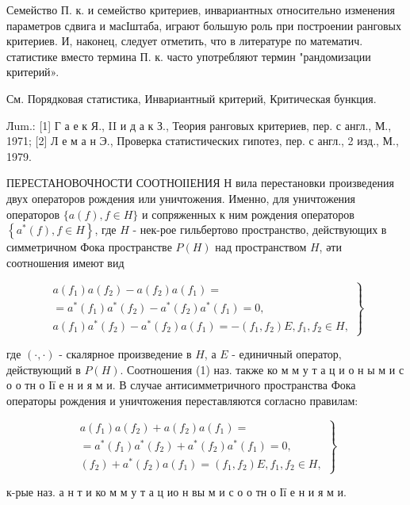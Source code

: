 \documentclass[10pt]{article}
\begin{document}
Семейство П. к. и семейство критериев, инвариантных относительно изменения параметров сдвига и масІштаба, играют большую роль при построении ранговых критериев. И, наконец, следует отметить, что в литературе по математич. статистике вместо термина П. к. часто употребляют термин "рандомизации критерий».

См. Порядковая статистика, Инвариантный критерий, Критическая бункция.

Лum.: [1] Г а е к Я., II и д а к З., Теория ранговых критериев, пер. с англ., М., 1971; [2] Л е м а н Э., Проверка статистических гипотез, пер. с англ., 2 изд., М., 1979.

ПЕРЕСТАНОВОЧНОСТИ СООТНОІІЕНИЯ Н вила перестановки произведения двух операторов рождения или уничтожения. Именно, для уничтожения операторов $\{a(f), f \in H\}$ и сопряженных к ним рождения операторов $\left\{a^{*}(f), f \in H\right\}$, где $H$ - нек-рое гильбертово пространство, действующих в симметричном Фока пространстве $P(H)$ над пространством $H$, әти соотношения имеют вид

\[
\left.\begin{array}{c}
a\left(f_{1}\right) a\left(f_{2}\right)-a\left(f_{2}\right) a\left(f_{1}\right)= \\
=a^{*}\left(f_{1}\right) a^{*}\left(f_{2}\right)-a^{*}\left(f_{2}\right) a^{*}\left(f_{1}\right)=0, \\
a\left(f_{1}\right) a^{*}\left(f_{2}\right)-a^{*}\left(f_{2}\right) a\left(f_{1}\right)=-\left(f_{1}, f_{2}\right) E, f_{1}, f_{2} \in H,
\end{array}\right\}
\]

где $(\cdot, \cdot)$ - скалярное произведение в $H$, а $E$ - единичный оператор, действующий в $P(H)$. Соотношения (1) наз. также ко м м у т а ц и о н ы м и с о о тн о Ії е н и я м и. В случае антисимметричного пространства Фока операторы рождения и уничтожения переставляются согласно правилам:

\[
\left.\begin{array}{c}
a\left(f_{1}\right) a\left(f_{2}\right)+a\left(f_{2}\right) a\left(f_{1}\right)= \\
=a^{*}\left(f_{1}\right) a^{*}\left(f_{2}\right)+a^{*}\left(f_{2}\right) a^{*}\left(f_{1}\right)=0, \\
\left(f_{2}\right)+a^{*}\left(f_{2}\right) a\left(f_{1}\right)=\left(f_{1}, f_{2}\right) E, f_{1}, f_{2} \in H,
\end{array}\right\}
\]

к-рые наз. а н т и ко м м у т а ц ио н вы м и с о о тн о Ії е н и я м и.
\end{document}
